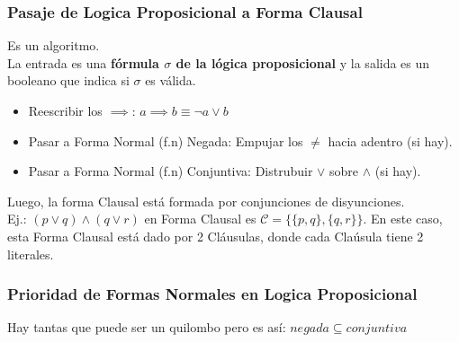 \documentclass[10pt,a4paper]{article}
\begin{document}
\subsubsection*{Pasaje de Logica Proposicional a Forma Clausal}
Es un algoritmo. \\
La entrada es una \textbf{fórmula $\sigma$ de la lógica proposicional} y la salida es un booleano que indica si $\sigma$ es válida. 
\begin{itemize}
    \item Reescribir los $\implies$: $a \implies b \equiv \neg a \lor b$
    \item Pasar a Forma Normal (f.n) Negada: Empujar los $\neq$ hacia adentro (si hay).
    \item Pasar a Forma Normal (f.n) Conjuntiva: Distrubuir $\lor$ sobre $\land$ (si hay).
\end{itemize}
Luego, la forma Clausal está formada por conjunciones de disyunciones. \\
Ej.: $(p \lor q) \land (q \lor r)$ en Forma Clausal es $\mathcal{C} = \{\{p,q\}, \{q, r\}\}$. En este caso, esta Forma Clausal está dado por 2 Cláusulas, donde cada Claúsula tiene 2 literales.
\subsubsection*{Prioridad de Formas Normales en Logica Proposicional}
Hay tantas que puede ser un quilombo pero es así: $negada  \subseteq conjuntiva$
\end{document}
